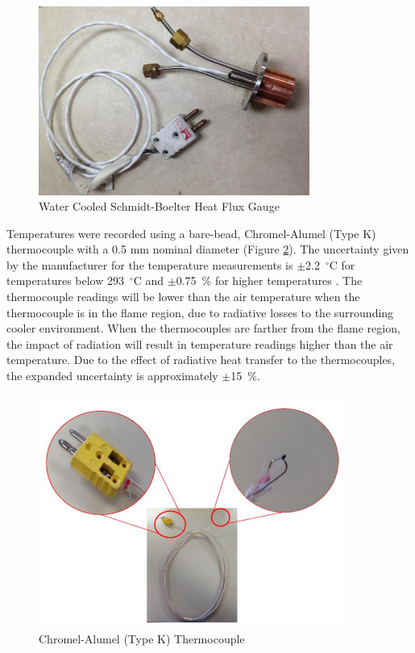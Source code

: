 \documentclass[12pt,oneside]{book}
\begin{document}
\begin{figure} [H]
	\centering
	\includegraphics[width = 3.5in]{0_Images/Instrumentation/Heat_Flux_Gauge.jpg}
	\caption{Water Cooled Schmidt-Boelter Heat Flux Gauge}
	\label{fig:HeatFluxGauge}
\end{figure}

Temperatures were recorded using a bare-bead, Chromel-Alumel (Type K) thermocouple with a 0.5 mm nominal diameter (Figure \ref{fig:Thermocouple}). The uncertainty given by the manufacturer for the temperature measurements is $\pm$2.2~$^\circ$C for temperatures below 293~$^\circ$C and $\pm$0.75~\% for higher temperatures \cite{TemperatureHandbook}. The thermocouple readings will be lower than the air temperature when the thermocouple is in the flame region, due to radiative losses to the surrounding cooler environment. When the thermocouples are farther from the flame region, the impact of radiation will result in temperature readings higher than the air temperature. Due to the effect of radiative heat transfer to the thermocouples, the expanded uncertainty is approximately $\pm$15~\%.

\begin{figure} [H]
	\centering
	\includegraphics[width = 4in]{0_Images/Instrumentation/Thermocouple.jpg}
	\caption{Chromel-Alumel (Type K) Thermocouple}
	\label{fig:Thermocouple}
\end{figure}
\end{document}
